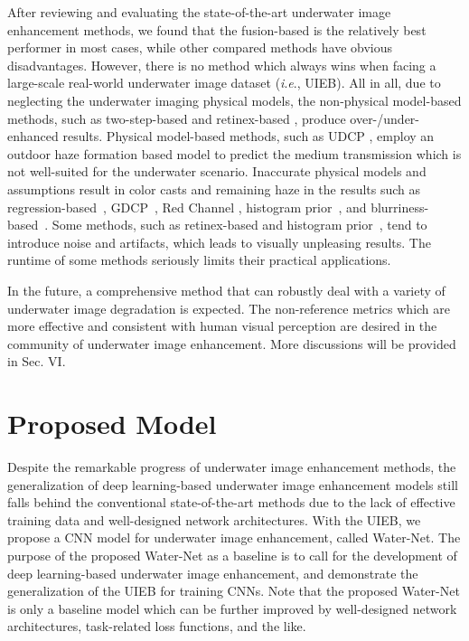 \documentclass[journal]{IEEEtran}
\newcommand{\ie}{\textit{i}.\textit{e}.}
\begin{document}
After reviewing and evaluating the state-of-the-art underwater image enhancement methods, we found that the fusion-based \cite{Ancuti2012} is the relatively best performer in most cases, while other compared methods have obvious disadvantages. However, there is no method which always wins when facing a large-scale real-world underwater image dataset (\ie, UIEB). All in all, due to neglecting the underwater imaging physical models, the non-physical model-based methods, such as two-step-based \cite{Fu2017} and retinex-based \cite{Fu2014}, produce over-/under-enhanced results. Physical model-based methods, such as UDCP \cite{Drews2016}, employ an outdoor haze formation based model to predict the medium transmission which is not well-suited for the underwater scenario. Inaccurate physical models and assumptions result in color casts and remaining haze in the results such as regression-based~\cite{Li2017prl}, GDCP~\cite{Peng2018}, Red Channel \cite{Galdran2015}, histogram prior~\cite{Li2016}, and blurriness-based~\cite{Peng2017}. Some methods, such as retinex-based \cite{Fu2014} and histogram prior~\cite{Li2016}, tend to introduce noise and artifacts, which leads to visually unpleasing results. The runtime of some methods seriously limits their practical applications.

In the future, a comprehensive method that can robustly deal with a variety of underwater image degradation is expected. The non-reference metrics which are more effective and consistent with human visual perception are desired in the community of underwater image enhancement. More discussions will be provided in Sec. VI.


\section{Proposed Model}
Despite the remarkable progress of underwater image enhancement methods, the generalization of deep learning-based underwater image enhancement models still falls behind the conventional state-of-the-art methods due to the lack of effective training data and well-designed network architectures. With the UIEB, we propose a CNN model for underwater image enhancement, called Water-Net.
The purpose of the proposed Water-Net as a baseline is to call for the development of deep learning-based underwater image enhancement, and demonstrate the generalization of the UIEB for training CNNs. Note that the proposed Water-Net is only a baseline model which can be further improved by well-designed network architectures, task-related loss functions, and the like.
\end{document}
